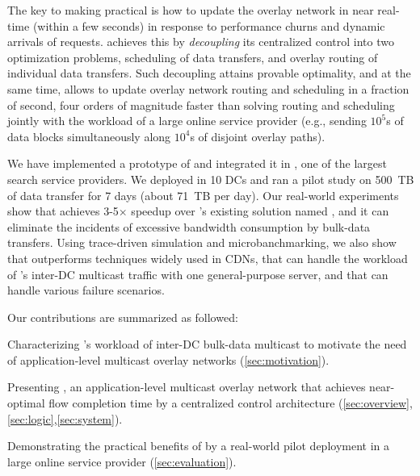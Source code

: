 The key to making \name practical is how to update the overlay
network in near real-time (within a few seconds) in response to
performance churns and dynamic arrivals of requests. \name achieves
this by {\em decoupling} its centralized control into two
optimization problems, scheduling of data transfers, and overlay
routing of individual data transfers. Such decoupling attains
provable optimality, and at the same time, allows \name to update
overlay network routing and scheduling in a fraction of second, four
orders of magnitude faster than solving routing and scheduling jointly
with the workload of a large online service provider (e.g., sending
$10^5$s of data blocks simultaneously along $10^4$s of disjoint
overlay paths).


We have implemented a prototype of \name and integrated it in
\company, one of the largest search service providers. We deployed
\name in 10 DCs and ran a pilot study on 500~TB of data transfer
for 7 days (about 71~TB per day).
Our real-world experiments show that \name achieves 3-5$\times$
speedup over \company's existing solution named \alg, and it can eliminate the
incidents of excessive bandwidth consumption by bulk-data transfers.
Using trace-driven simulation and microbanchmarking, we also show
that \name outperforms techniques widely used in CDNs, that \name
can handle the workload of \company's inter-DC multicast traffic with
one general-purpose server, and that \name can handle various
failure scenarios.


Our contributions are summarized as followed:
\begin{packeditemize}
\item Characterizing \company's workload of inter-DC bulk-data
multicast to motivate the need of application-level multicast
overlay networks (\Section\ref{sec:motivation}).
\item Presenting \name, an application-level multicast overlay
network that achieves near-optimal flow completion time by a
centralized control architecture
(\Section\ref{sec:overview},\ref{sec:logic},\ref{sec:system}).
\item Demonstrating the practical benefits of \name by a real-world
pilot deployment in a large online service provider
(\Section\ref{sec:evaluation}).
\end{packeditemize}
